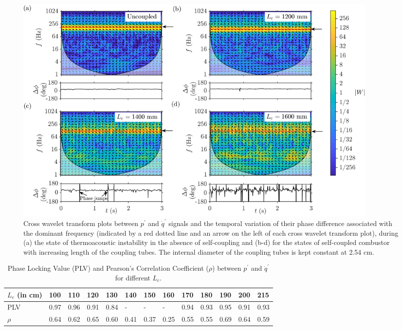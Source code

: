\documentclass[twocolumn,10pt]{article} %
\begin{document}
\begin{figure}[t!]
\centering
\includegraphics[width=0.9\textwidth]{all_copy.png}
\caption{Cross wavelet transform plots between $p^\prime$ and $\dot{q}^\prime$ signals and the temporal variation of their phase difference associated with the dominant frequency (indicated by a red dotted line and an arrow on the left of each cross wavelet transform plot), during (a) the state of thermoacoustic instability in the absence of self-coupling and (b-d) for the states of self-coupled combustor with increasing length of the coupling tubes. The internal diameter of the coupling tubes is kept constant at 2.54 cm. }
\label{fig4}
\end{figure}

\begin{table}[!b] \small
\centering
\caption{\label{table} Phase Locking Value (PLV) and Pearson's Correlation Coefficient ($\rho$) between $p^\prime$ and $\dot{q}^\prime$ for different $L_c$.}
\begin{tabular}{|l|l|l|l|l|l|l|l|l|l|l|l|l|}
\hline
$L_c$ (in cm)                   & 100  & 110  & 120  & 130  & 140  & 150  & 160  & 170  & 180  & 190  & 200  & 215  \\
\hline
PLV                 & 0.97 & 0.96 & 0.91 & 0.84 &   -   &    -  &   -   & 0.94 & 0.93 & 0.95 & 0.91 & 0.93 \\
\hline
$\rho$ & 0.64 & 0.62 & 0.65 & 0.60 & 0.41 & 0.37 & 0.25 & 0.55 & 0.55 & 0.69 & 0.64 & 0.59 \\
\hline
\end{tabular}
\label{table}
\end{table}
\end{document}
